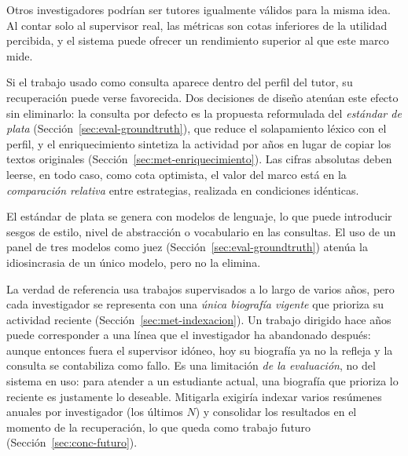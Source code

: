 \begin{mydescription}
    \item[Un único relevante por consulta.]
    Otros investigadores podrían ser tutores igualmente válidos para la misma idea.
    Al contar solo al supervisor real, las métricas son cotas inferiores de la utilidad percibida, y el sistema puede ofrecer un rendimiento superior al que este marco mide.
    \item[Posible solapamiento entre consulta y perfil.]
    Si el trabajo usado como consulta aparece dentro del perfil del tutor, su recuperación puede verse favorecida.
    Dos decisiones de diseño atenúan este efecto sin eliminarlo: la consulta por defecto es la propuesta reformulada del \emph{estándar de plata} (Sección~\ref{sec:eval-groundtruth}), que reduce el solapamiento léxico con el perfil, y el enriquecimiento sintetiza la actividad por años en lugar de copiar los textos originales (Sección~\ref{sec:met-enriquecimiento}).
    Las cifras absolutas deben leerse, en todo caso, como cota optimista, el valor del marco está en la \emph{comparación relativa} entre estrategias, realizada en condiciones idénticas.
    \item[Dependencia de consultas reformuladas por \gls{llm}.]
    El estándar de plata se genera con modelos de lenguaje, lo que puede introducir sesgos de estilo, nivel de abstracción o vocabulario en las consultas.
    El uso de un panel de tres modelos como juez (Sección~\ref{sec:eval-groundtruth}) atenúa la idiosincrasia de un único modelo, pero no la elimina.
    \item[Desajuste temporal entre la consulta histórica y el perfil vigente.]
    La verdad de referencia usa trabajos supervisados a lo largo de varios años, pero cada investigador se representa con una \emph{única biografía vigente} que prioriza su actividad reciente (Sección~\ref{sec:met-indexacion}).
    Un trabajo dirigido hace años puede corresponder a una línea que el investigador ha abandonado después: aunque entonces fuera el supervisor idóneo, hoy su biografía ya no la refleja y la consulta se contabiliza como fallo.
    Es una limitación \emph{de la evaluación}, no del sistema en uso: para atender a un estudiante actual, una biografía que prioriza lo reciente es justamente lo deseable. Mitigarla exigiría indexar varios resúmenes anuales por investigador (los últimos $N$) y consolidar los resultados en el momento de la recuperación, lo que queda como trabajo futuro (Sección~\ref{sec:conc-futuro}).
\end{mydescription}

